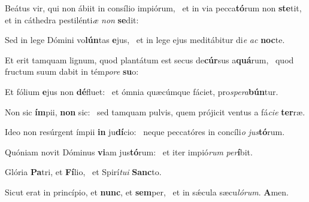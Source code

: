 \item Beátus vir, qui non ábiit in consílio impiórum,~\pscross{} et in via pecca\textbf{tó}rum non \textbf{ste}tit,~\psstar{} et in cáthedra pestilénti\textit{æ} \textit{non} \textbf{se}dit:
\item Sed in lege Dómini vo\textbf{lún}tas \textbf{e}jus,~\psstar{} et in lege ejus meditábitur di\textit{e} \textit{ac} \textbf{noc}te.
\item Et erit tamquam lignum, quod plantátum est secus de\textbf{cúr}sus a\textbf{quá}rum,~\psstar{} quod fructum suum dabit in tém\textit{pore} \textbf{su}o:
\item Et fólium \textbf{e}jus non \textbf{dé}fluet:~\psstar{} et ómnia quæcúmque fáciet, pro\textit{spera}\textbf{bún}tur.
\item Non sic \textbf{ím}pii, \textbf{non} sic:~\psstar{} sed tamquam pulvis, quem prójicit ventus a fá\textit{cie} \textbf{ter}ræ.
\item Ideo non resúrgent ímpii \textbf{in} ju\textbf{dí}cio:~\psstar{} neque peccatóres in concíli\textit{o} \textit{jus}\textbf{tó}rum.
\item Quóniam novit Dóminus \textbf{vi}am jus\textbf{tó}rum:~\psstar{} et iter impió\textit{rum} \textit{per}\textbf{í}bit.
\item Glória \textbf{Pa}tri, et \textbf{Fí}lio,~\psstar{} et Spirí\textit{tui} \textbf{Sanc}to.
\item Sicut erat in princípio, et \textbf{nunc}, et \textbf{sem}per,~\psstar{} et in sǽcula sæcu\textit{lórum}. \textbf{A}men.

